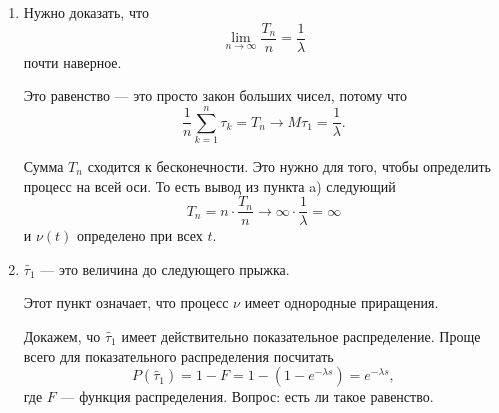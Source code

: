 \begin{enumerate}[label=\alph*)]
  \item Нужно доказать, что
  $$ \lim \limits_{n \to \infty } \frac{T_n}{n} =
    \frac{1}{ \lambda }$$
  почти наверное.

  Это равенство --- это просто закон больших чисел, потому что
  $$ \frac{1}{n} \sum \limits_{k = 1}^n \tau_k = T_n \to
    M \tau_1 = \frac{1}{ \lambda }.$$

  Сумма $T_n$ сходится к бесконечности.
  Это нужно для того, чтобы определить процесс на всей оси.
  То есть вывод из пункта a) следующий
  $$T_n =
    n \cdot \frac{T_n}{n} \to
    \infty \cdot \frac{1}{ \lambda } =
    \infty $$
  и $ \nu \left( t \right) $ определено при всех $t$.
  \item $ \tilde{ \tau_1}$ --- это величина до следующего прыжка.

  Этот пункт означает, что процесс $ \nu $ имеет однородные приращения.

  Докажем, чо $ \tilde{ \tau_1}$ имеет действительно показательное распределение.
  Проще всего для показательного распределения посчитать
  $$P \left( \tilde{ \tau_1} \right) =
    1 - F =
    1 - \left( 1 - e^{-\lambda s} \right) =
    e^{-\lambda s},$$
  где $F$ --- функция распределения.
  Вопрос: есть ли такое равенство.


\end{enumerate}
